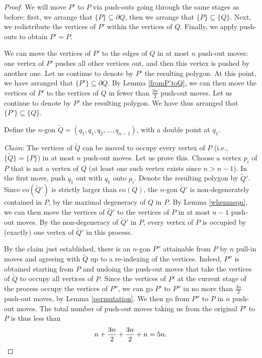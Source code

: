 \documentclass[11pt]{amsart}
\theoremstyle{remark}
\numberwithin{equation}{section}
\newcommand{\co}{\mathrm{co}}
\begin{document}
\begin{proof}
We will move $P'$ to $P$ via push-outs going through the same stages as before: first, we arrange that $\{P\}\subseteq \partial Q$, then we  arrange that $\{P\}\subseteq \{Q\}$. Next,  we redistribute the vertices of $P'$ within the vertices of $Q$. Finally, we apply push-outs to obtain $P'=P$.

We can move the vertices of $P'$ to the edges of $Q$ in at most $n$ push-out moves: one vertex of $P'$ pushes all other vertices out, and then this vertex is pushed by another one.  Let us continue to denote by $P'$ the resulting polygon. At this point, we have arranged that $\{P'\}\subseteq \partial Q$.
By Lemma \ref{fromP'toQ}, we can then move the vertices of  $P'$ to the vertices of $Q$ in fewer than $\frac{3n}{2}$ push-out moves. Let us continue to denote by $P'$ the resulting polygon. We have thus arranged that $\{P'\}\subseteq \{Q\}$.


Define the $n$-gon $\tilde Q=(q_1,q_1,q_2,\ldots,q_{n-1})$, with a double point at $q_1$.

\emph{Claim}: The vertices of $\tilde Q$ can be moved to occupy every vertex of $P$ (i.e., $\{\tilde Q\}=\{P\}$) in at most $n$ push-out moves. Let us prove this.  Choose a vertex $p_i$ of $P$ that is not  a vertex of $Q$ (at least one such vertex exists since $n>n-1$).  In the first move, push $q_1$ out with $q_1$ onto $p_i$. Denote the resulting polygon by $\tilde Q'$. Since $\co(\tilde Q')$ is  strictly larger than $\co(Q)$, the $n$-gon  $\tilde Q'$ is non-degenerately contained in $P$, by the maximal degeneracy of $Q$ in $P$. By Lemma \ref{whenmeqn}, we can then move the vertices of $\tilde Q'$ to the vertices of $P$ in at most $n-1$ push-out moves. By the non-degeneracy of  $\tilde Q'$ in $P$, every vertex of $P$ is occupied by (exactly) one vertex of   $\tilde Q'$ in this process.

By the claim just established, there is an $n$-gon $P''$ attainable from $P$ by $n$ pull-in moves and agreeing with $\tilde Q$ up to a re-indexing of the vertices. Indeed, $P''$ is obtained starting from $P$ and undoing the push-out moves that take the vertices of $\tilde Q$ to occupy all vertices of $P$. 
Since the vertices of $P'$ at the current stage of the process occupy the vertices of $P''$, we can go $P'$ to $P''$ in no more than $\frac{3n}{2}$ push-out moves,
by Lemma \ref{permutation}. We then go from $P''$ to $P$ in $n$ push-out moves.  The total number of push-out moves taking us from the original $P'$ to $P$ is thus less than 
\[
n+\frac{3n}{2}+\frac{3n}{2}+n=5n.\qedhere
\]
\end{proof}
\end{document}
